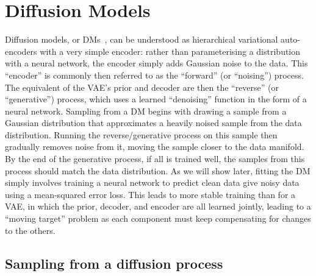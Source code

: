 \chapter{Diffusion Models}
\label{ch:diffusion}

Diffusion models, or DMs~\citep{sohl2015deep,ho2020denoising,nichol2021improved,song2020score}, can be understood as hierarchical variational auto-encoders with a very simple encoder: rather than parameterising a distribution with a neural network, the encoder simply adds Gaussian noise to the data. This ``encoder'' is commonly then referred to as the ``forward'' (or ``noising'') process. The equivalent of the VAE's prior and decoder are then the ``reverse'' (or ``generative'') process, which uses a learned ``denoising'' function in the form of a neural network. Sampling from a DM begins with drawing a sample from a Gaussian distribution that approximates a heavily noised sample from the data distribution. Running the reverse/generative process on this sample then gradually removes noise from it, moving the sample closer to the data manifold. By the end of the generative process, if all is trained well, the samples from this process should match the data distribution. As we will show later, fitting the DM simply involves training a neural network to predict clean data give noisy data using a mean-squared error loss. This leads to more stable training than for a VAE, in which the prior, decoder, and encoder are all learned jointly, leading to a ``moving target'' problem as each component must keep compensating for changes to the others.


\section{Sampling from a diffusion process}


